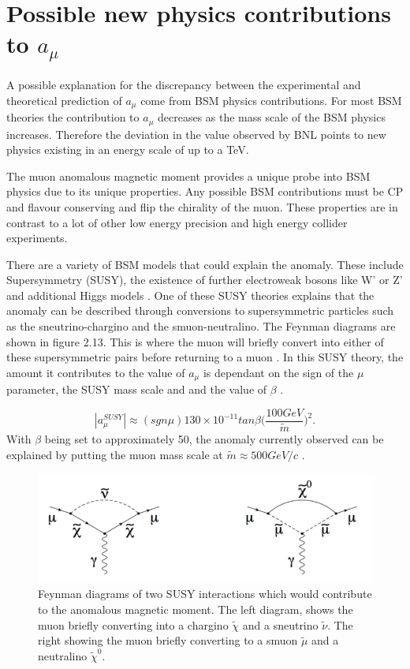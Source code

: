 \section{Possible new physics contributions to $a_{\mu}$}

A possible explanation for the discrepancy between the experimental and theoretical prediction of $a_{\mu}$ come from BSM physics contributions. For most BSM theories the contribution to $a_{\mu}$ decreases as the mass scale of the BSM physics increases. Therefore the deviation in the value observed by BNL points to new physics existing in an energy scale of up to a TeV.

The muon anomalous magnetic moment provides a unique probe into BSM physics due to its unique properties. Any possible BSM contributions must be CP and flavour conserving and flip the chirality of the muon. These properties are in contrast to a lot of other low energy precision and high energy collider experiments.

There are a variety of BSM models that could explain the anomaly. These include Supersymmetry (SUSY), the existence of further electroweak bosons like W' or Z' and additional Higgs models \cite{Reference1}.
One of these SUSY theories explains that the anomaly can be described through conversions to supersymmetric particles such as the sneutrino-chargino and the smuon-neutralino. The Feynman diagrams are shown in figure 2.13. This is where the muon will briefly convert into either of these supersymmetric pairs before returning to a muon \cite{Reference30}. In this SUSY theory, the amount it contributes to the value of $a_\mu$ is dependant on the sign of the $\mu$ parameter, the SUSY mass scale and and the value of $\beta$ \cite{Reference30}.

\begin{equation}
|a_{\mu}^{SUSY}| \approx (sgn\mu) 130\times10^{-11} tan\beta \Big(\frac{100GeV}{\tilde{m}}\Big)^2.
\end{equation}
\noindent
With $\beta$ being set to approximately 50, the anomaly currently observed can be explained by putting the muon mass scale at ${\tilde{m}} \approx 500GeV/c$ \cite{Reference31}\cite{Reference32}. 

\begin{figure}[th]
\centering
\includegraphics[scale=0.7]{Figures/SUSY}
\decoRule
\caption{Feynman diagrams of two SUSY interactions which would contribute to the anomalous magnetic moment. The left diagram, shows the muon briefly converting into a chargino $\tilde{\chi}$ and a sneutrino $\tilde{\nu}$. The right showing the muon briefly converting to a smuon $\tilde{\mu}$ and a neutralino $\tilde{\chi}^0$.}
\label{fig:SUSY}
\end{figure}

